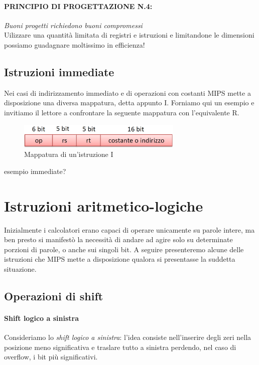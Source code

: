 \documentclass[class=book, crop=false]{standalone}
\begin{document}
\paragraph{PRINCIPIO DI PROGETTAZIONE N.4:}
\emph{Buoni progetti richiedono buoni compromessi}\\

Uilizzare una quantità limitata di registri e istruzioni e limitandone le dimensioni possiamo guadagnare moltissimo in efficienza!

\subsection{Istruzioni immediate}
Nei casi di indirizzamento immediato e di operazioni con costanti MIPS mette a disposizione una diversa mappatura, detta appunto I. Forniamo qui un esempio e invitiamo il lettore a confrontare la seguente mappatura con l'equivalente R.
\begin{figure}[H]
	\centering
	\includegraphics[width=0.7\textwidth,keepaspectratio]{I.png}
	\caption{Mappatura di un'istruzione I}
\end{figure}

esempio immediate?

\section{Istruzioni aritmetico-logiche}

Inizialmente i calcolatori erano capaci di operare unicamente su parole intere, ma ben presto si manifestò la necessità di andare ad agire solo su determinate porzioni di parole, o anche sui singoli bit. A seguire presenteremo alcune delle istruzioni che MIPS mette a disposizione qualora si presentasse la suddetta situazione.

\subsection{Operazioni di shift}

\paragraph{Shift logico a sinistra}
Consideriamo lo \emph{shift logico a sinistra}: l'idea consiste nell'inserire degli zeri nella posizione meno significativa e traslare tutto a sinistra perdendo, nel caso di overflow, i bit più significativi.
\end{document}
